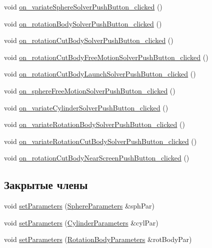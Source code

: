 \begin{DoxyCompactItemize}
\item 
void \mbox{\hyperlink{class_main_window_a34d41c030a12cb9a8ddee74f19888501}{on\+\_\+variate\+Sphere\+Solver\+Push\+Button\+\_\+clicked}} ()
\item 
void \mbox{\hyperlink{class_main_window_a780cba7468f901dc962301046767cabf}{on\+\_\+rotation\+Body\+Solver\+Push\+Button\+\_\+clicked}} ()
\item 
void \mbox{\hyperlink{class_main_window_a9f384827fc7fce8088470694b45059cd}{on\+\_\+rotation\+Cut\+Body\+Solver\+Push\+Button\+\_\+clicked}} ()
\item 
void \mbox{\hyperlink{class_main_window_a5fc924ef6a091de5360f9d6ce9a13319}{on\+\_\+rotation\+Cut\+Body\+Free\+Motion\+Solver\+Push\+Button\+\_\+clicked}} ()
\item 
void \mbox{\hyperlink{class_main_window_a39f02faba9e7dcb6cf63f9cc147f1def}{on\+\_\+rotation\+Cut\+Body\+Launch\+Solver\+Push\+Button\+\_\+clicked}} ()
\item 
void \mbox{\hyperlink{class_main_window_afd445c8afcf17d5b5010a046d3e69bfd}{on\+\_\+sphere\+Free\+Motion\+Solver\+Push\+Button\+\_\+clicked}} ()
\item 
void \mbox{\hyperlink{class_main_window_a13218126a3188b4b77db3f14e24e00f5}{on\+\_\+variate\+Cylinder\+Solver\+Push\+Button\+\_\+clicked}} ()
\item 
void \mbox{\hyperlink{class_main_window_ab7173dd837ed3995f96b18621af9735b}{on\+\_\+variate\+Rotation\+Body\+Solver\+Push\+Button\+\_\+clicked}} ()
\item 
void \mbox{\hyperlink{class_main_window_afda202c413199135427ca6a1b19587c5}{on\+\_\+variate\+Rotation\+Cut\+Body\+Solver\+Push\+Button\+\_\+clicked}} ()
\item 
void \mbox{\hyperlink{class_main_window_a2529d60ec2858b6150222fdf70579bac}{on\+\_\+rotation\+Cut\+Body\+Near\+Screen\+Push\+Button\+\_\+clicked}} ()
\end{DoxyCompactItemize}
\subsection*{Закрытые члены}
\begin{DoxyCompactItemize}
\item 
void \mbox{\hyperlink{class_main_window_a1ef9379070e1d8ab765b13468c8922e1}{set\+Parameters}} (\mbox{\hyperlink{struct_sphere_parameters}{Sphere\+Parameters}} \&sph\+Par)
\item 
void \mbox{\hyperlink{class_main_window_a9923fe4ddabc8c7ccdd1917ff85b7a8e}{set\+Parameters}} (\mbox{\hyperlink{struct_cylinder_parameters}{Cylinder\+Parameters}} \&cyl\+Par)
\item 
void \mbox{\hyperlink{class_main_window_aab98868ae81e753a51d161038105b493}{set\+Parameters}} (\mbox{\hyperlink{struct_rotation_body_parameters}{Rotation\+Body\+Parameters}} \&rot\+Body\+Par)
\end{DoxyCompactItemize}
